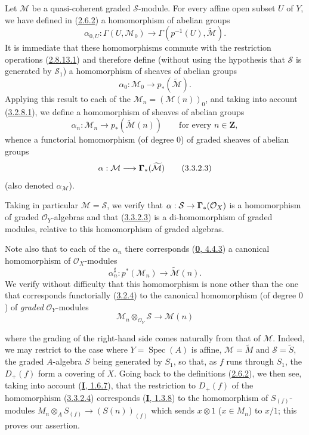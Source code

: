 \begin{env}[3.3.2]
\label{II.3.3.2}
Let $\mathcal{M}$ be a quasi-coherent graded $\mathcal{S}$-module. For every
affine open subset $U$ of $Y$, we have defined in
(\hyperref[II.2.6.2]{2.6.2}) a homomorphism of abelian groups
\[
  \alpha_{0,U}:\Gamma(U,\mathcal{M}_0)
  \longrightarrow\Gamma(p^{-1}(U),\widetilde{\mathcal{M}}).
\]
It is immediate that these homomorphisms commute with the restriction
operations (\hyperref[II.2.8.13.1]{2.8.13.1}) and therefore define
(without using the hypothesis that $\mathcal{S}$ is generated by
$\mathcal{S}_1$) a homomorphism of sheaves of abelian groups
\[
\label{II.3.3.2.1}
  \alpha_0:\mathcal{M}_0\longrightarrow p_*(\widetilde{\mathcal{M}}).
\tag{3.3.2.1}
\]
Applying this result to each of the
$\mathcal{M}_n=(\mathcal{M}(n))_0$, and taking into account
(\hyperref[II.3.2.8.1]{3.2.8.1}), we define a homomorphism of sheaves of
abelian groups
\[
\label{II.3.3.2.2}
  \alpha_n:\mathcal{M}_n\longrightarrow
  p_*(\widetilde{\mathcal{M}}(n))
  \qquad\text{for every }n\in\mathbf{Z},
\tag{3.3.2.2}
\]
whence a functorial homomorphism (of degree $0$) of graded sheaves of abelian
groups
\[
\label{II.3.3.2.3}
  \alpha:\mathcal{M}\longrightarrow\boldsymbol{\Gamma}_*(\widetilde{\mathcal{M}})
\tag{3.3.2.3}
\]
(also denoted $\alpha_{\mathcal{M}}$).

Taking in particular $\mathcal{M}=\mathcal{S}$, we verify that
$\alpha:\mathcal{S}\to\boldsymbol{\Gamma}_*(\mathcal{O}_X)$ is a homomorphism of graded
$\mathcal{O}_Y$-algebras and that
(\hyperref[II.3.3.2.3]{3.3.2.3}) is a di-homomorphism of graded modules,
relative to this homomorphism of graded algebras.

Note also that to each of the $\alpha_n$ there corresponds
(\hyperref[0.4.4.3]{\textbf{0}, 4.4.3}) a canonical homomorphism of
$\mathcal{O}_X$-modules
\[
\label{II.3.3.2.4}
  \alpha_n^\sharp:p^*(\mathcal{M}_n)
  \longrightarrow\widetilde{\mathcal{M}}(n).
\tag{3.3.2.4}
\]
We verify without difficulty that this homomorphism is none other than the
one that corresponds functorially (\hyperref[II.3.2.4]{3.2.4}) to the
canonical homomorphism (of degree $0$) of \emph{graded} $\mathcal{O}_Y$-modules
\[
\label{II.3.3.2.5}
  \mathcal{M}_n\otimes_{\mathcal{O}_Y}\mathcal{S}
  \longrightarrow\mathcal{M}(n)
\tag{3.3.2.5}
\]


where the grading of the right-hand side comes naturally from that of
$\mathcal{M}$. Indeed, we may restrict to the case where
$Y=\operatorname{Spec}(A)$ is affine, $\mathcal{M}=\widetilde{M}$ and
$\mathcal{S}=\widetilde{S}$, the graded $A$-algebra $S$ being generated by
$S_1$, so that, as $f$ runs through $S_1$, the $D_+(f)$ form a covering of
$X$. Going back to the definitions
(\hyperref[II.2.6.2]{2.6.2}), we then see, taking into account
(\hyperref[I.1.6.7]{\textbf{I}, 1.6.7}), that the restriction to $D_+(f)$ of
the homomorphism (\hyperref[II.3.3.2.4]{3.3.2.4}) corresponds
(\hyperref[I.1.3.8]{\textbf{I}, 1.3.8}) to the homomorphism of $S_{(f)}$-modules
$M_n\otimes_A S_{(f)}\to(S(n))_{(f)}$ which sends $x\otimes1$ ($x\in M_n$)
to $x/1$; this proves our assertion.
\end{env}

